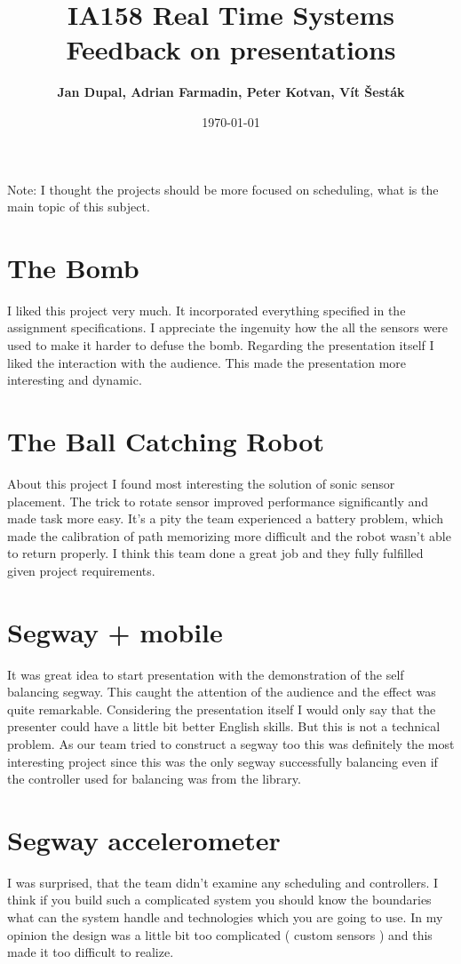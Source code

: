 \documentclass{article}
\title{
\textmd{IA158 Real Time Systems}\\
\textmd{\textbf{Feedback on presentations}}
}
\author{\textbf{Jan Dupal, Adrian Farmadin, Peter Kotvan, Vít Šesták}}
\date{\today} %
\begin{document}
\maketitle

Note: I thought the projects should be more focused on scheduling, what is the
main topic of this subject.

\section*{The Bomb}

I liked this project very much. It incorporated everything specified in the
assignment specifications. I appreciate the ingenuity how the all the sensors
were used to make it harder to defuse the bomb. Regarding the presentation
itself I liked the interaction with the audience. This made the presentation
more interesting and dynamic.

\section*{The Ball Catching Robot}

About this project I found most interesting the solution of sonic sensor
placement. The trick to rotate sensor improved performance significantly and
made task more easy. It's a pity the team experienced a battery problem, which
made the calibration of path memorizing more difficult and the robot wasn't able
to return properly. I think this team done a great job and they fully fulfilled
given project requirements.

\section*{Segway + mobile}

It was great idea to start presentation with the demonstration of the self
balancing segway. This caught the attention of the audience and the effect was
quite remarkable. Considering the presentation itself I would only say that the
presenter could have a little bit better English skills. But this is not a
technical problem. As our team tried to construct a segway too this was
definitely the most interesting project since this was the only segway
successfully balancing even if the controller used for balancing was from the
library.

\section*{Segway accelerometer}

I was surprised, that the team didn't examine any scheduling and controllers. I
think if you build such a complicated system you should know the boundaries what
can the system handle and technologies which you are going to use. In my opinion
the design was a little bit too complicated ( custom sensors ) and this made it
too difficult to realize. 
\end{document}
